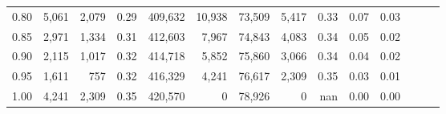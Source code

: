 \begin{tabular}{rrrrrrrrrrrrrr}
0.80 &   5,061 &  2,079 &  0.29 &  409,632 &   10,938 &  73,509 &   5,417 &  0.33 &  0.07 &      0.03 \\
0.85 &   2,971 &  1,334 &  0.31 &  412,603 &    7,967 &  74,843 &   4,083 &  0.34 &  0.05 &      0.02 \\
0.90 &   2,115 &  1,017 &  0.32 &  414,718 &    5,852 &  75,860 &   3,066 &  0.34 &  0.04 &      0.02 \\
0.95 &   1,611 &    757 &  0.32 &  416,329 &    4,241 &  76,617 &   2,309 &  0.35 &  0.03 &      0.01 \\
1.00 &   4,241 &  2,309 &  0.35 &  420,570 &        0 &  78,926 &       0 &   nan &  0.00 &      0.00 \\
\bottomrule
\end{tabular}
